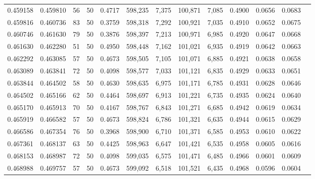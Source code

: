 \begin{tabular}{rrrrrrrrrrrrr}
0.459158 & 0.459810 &    56 &  50 &                                     0.4717 & 598,235 &   7,375 & 100,871 &   7,085 & 0.4900 & 0.0656 & 0.0683 \\
0.459816 & 0.460736 &    83 &  50 &                                     0.3759 & 598,318 &   7,292 & 100,921 &   7,035 & 0.4910 & 0.0652 & 0.0675 \\
0.460746 & 0.461630 &    79 &  50 &                                     0.3876 & 598,397 &   7,213 & 100,971 &   6,985 & 0.4920 & 0.0647 & 0.0668 \\
0.461630 & 0.462280 &    51 &  50 &                                     0.4950 & 598,448 &   7,162 & 101,021 &   6,935 & 0.4919 & 0.0642 & 0.0663 \\
0.462292 & 0.463085 &    57 &  50 &                                     0.4673 & 598,505 &   7,105 & 101,071 &   6,885 & 0.4921 & 0.0638 & 0.0658 \\
0.463089 & 0.463841 &    72 &  50 &                                     0.4098 & 598,577 &   7,033 & 101,121 &   6,835 & 0.4929 & 0.0633 & 0.0651 \\
0.463844 & 0.464502 &    58 &  50 &                                     0.4630 & 598,635 &   6,975 & 101,171 &   6,785 & 0.4931 & 0.0628 & 0.0646 \\
0.464502 & 0.465166 &    62 &  50 &                                     0.4464 & 598,697 &   6,913 & 101,221 &   6,735 & 0.4935 & 0.0624 & 0.0640 \\
0.465170 & 0.465913 &    70 &  50 &                                     0.4167 & 598,767 &   6,843 & 101,271 &   6,685 & 0.4942 & 0.0619 & 0.0634 \\
0.465919 & 0.466582 &    57 &  50 &                                     0.4673 & 598,824 &   6,786 & 101,321 &   6,635 & 0.4944 & 0.0615 & 0.0629 \\
0.466586 & 0.467354 &    76 &  50 &                                     0.3968 & 598,900 &   6,710 & 101,371 &   6,585 & 0.4953 & 0.0610 & 0.0622 \\
0.467361 & 0.468137 &    63 &  50 &                                     0.4425 & 598,963 &   6,647 & 101,421 &   6,535 & 0.4958 & 0.0605 & 0.0616 \\
0.468153 & 0.468987 &    72 &  50 &                                     0.4098 & 599,035 &   6,575 & 101,471 &   6,485 & 0.4966 & 0.0601 & 0.0609 \\
0.468988 & 0.469757 &    57 &  50 &                                     0.4673 & 599,092 &   6,518 & 101,521 &   6,435 & 0.4968 & 0.0596 & 0.0604 \\

\end{tabular}
